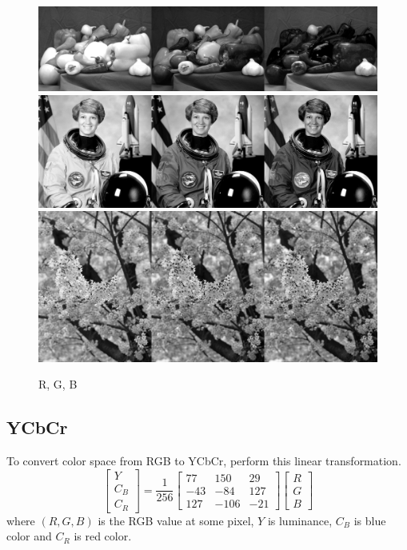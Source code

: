 \documentclass{article}
\begin{document}
\begin{figure}[h]
    \centering
    \includegraphics[width=.4\textwidth]{fig/RGB_peppers.png}\\
    \includegraphics[width=.4\textwidth]{fig/RGB_astronaut.png}\\
    \includegraphics[width=.4\textwidth]{fig/RGB_cb.png}
    \caption{R, G, B}
\end{figure}

\subsection{YCbCr}
To convert color space from RGB to YCbCr, perform this linear transformation.
$$
\begin{bmatrix}
    Y \\ C_B \\ C_R
\end{bmatrix}
=
\frac{1}{256}
\begin{bmatrix}
    77 & 150 & 29 \\
    -43 & -84 & 127 \\
    127 & -106 & -21
\end{bmatrix}
\begin{bmatrix}
    R \\ G \\ B
\end{bmatrix}
$$
where $(R, G, B)$ is the RGB value at some pixel, $Y$ is luminance, $C_B$ is blue color and $C_R$ is red color.
\end{document}

